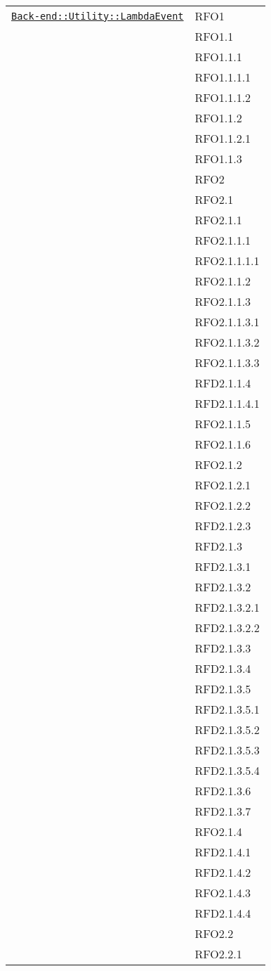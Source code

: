 \begin{longtable}{|>{\centering}m{10cm}|m{3cm}<{\centering}|}
\hyperref[Back-end::Utility::LambdaEvent]{\texttt{Back-end::Utility::LambdaEvent}} & RFO1\\
& RFO1.1\\
& RFO1.1.1\\
& RFO1.1.1.1\\
& RFO1.1.1.2\\
& RFO1.1.2\\
& RFO1.1.2.1\\
& RFO1.1.3\\
& RFO2\\
& RFO2.1\\
& RFO2.1.1\\
& RFO2.1.1.1\\
& RFO2.1.1.1.1\\
& RFO2.1.1.2\\
& RFO2.1.1.3\\
& RFO2.1.1.3.1\\
& RFO2.1.1.3.2\\
& RFO2.1.1.3.3\\
& RFD2.1.1.4\\
& RFD2.1.1.4.1\\
& RFO2.1.1.5\\
& RFO2.1.1.6\\
& RFO2.1.2\\
& RFO2.1.2.1\\
& RFO2.1.2.2\\
& RFD2.1.2.3\\
& RFD2.1.3\\
& RFD2.1.3.1\\
& RFD2.1.3.2\\
& RFD2.1.3.2.1\\
& RFD2.1.3.2.2\\
& RFD2.1.3.3\\
& RFD2.1.3.4\\
& RFD2.1.3.5\\
& RFD2.1.3.5.1\\
& RFD2.1.3.5.2\\
& RFD2.1.3.5.3\\
& RFD2.1.3.5.4\\
& RFD2.1.3.6\\
& RFD2.1.3.7\\
& RFO2.1.4\\
& RFD2.1.4.1\\
& RFD2.1.4.2\\
& RFO2.1.4.3\\
& RFD2.1.4.4\\
& RFO2.2\\
& RFO2.2.1\\

\end{longtable}
